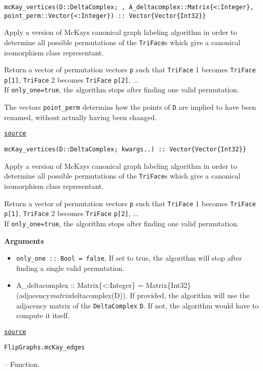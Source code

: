 \begin{adjustwidth}{2em}{0pt}


\begin{verbatim}
mcKay_vertices(D::DeltaComplex; , A_deltacomplex::Matrix{<:Integer}, point_perm::Vector{<:Integer}) :: Vector{Vector{Int32}}
\end{verbatim}

Apply a version of McKay{\textquotesingle}s canonical graph labeling algorithm in order to determine all possible permutations  of the \texttt{TriFace}s which give a canonical isomorphism class representant.

Return a vector of permutation vectors \texttt{p} such that \texttt{TriFace} 1 becomes \texttt{TriFace} \texttt{p[1]}, \texttt{TriFace} 2 becomes \texttt{TriFace} \texttt{p[2]}, ...\\
If \texttt{only\_one=true}, the algorithm stops after finding one valid permutation.

The vectors \texttt{point\_perm} determins how the points of \texttt{D} are implied to have been renamed, without actually having been changed.



\href{https://github.com/schto223/FlipGraphs.jl/blob/e35d43698a06b86273148826b79d585ba04fcd26/src/flipGraph.jl#L773-L783}{\texttt{source}}



\begin{verbatim}
mcKay_vertices(D::DeltaComplex; kwargs..) :: Vector{Vector{Int32}}
\end{verbatim}

Apply a version of McKay{\textquotesingle}s canonical graph labeling algorithm in order to determine all possible permutations  of the \texttt{TriFace}s which give a canonical isomorphism class representant.

Return a vector of permutation vectors \texttt{p} such that \texttt{TriFace} 1 becomes \texttt{TriFace} \texttt{p[1]}, \texttt{TriFace} 2 becomes \texttt{TriFace} \texttt{p[2]}, ...\\
If \texttt{only\_one=true}, the algorithm stops after finding one valid permutation.

\textbf{Arguments}

\begin{itemize}
\item \texttt{only\_one :: Bool = false}, If set to true, the algorithm will stop after finding a single valid permutation.


\item A\_deltacomplex :: Matrix\{<:Integer\} = Matrix\{Int32\}(adjacency\emph{matrix}deltacomplex(D)). If provided, the algorithm will use the adjacency matrix of the \texttt{DeltaComplex} \texttt{D}. If not, the algorithm would have to compute it itself.

\end{itemize}


\href{https://github.com/schto223/FlipGraphs.jl/blob/e35d43698a06b86273148826b79d585ba04fcd26/src/flipGraph.jl#L805-L817}{\texttt{source}}


\end{adjustwidth}
\hypertarget{16516759205726853869}{\texttt{FlipGraphs.mcKay\_edges}}  -- {Function.}

